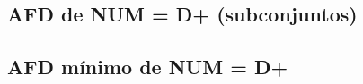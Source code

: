 \documentclass[11pt]{article}
\begin{document}
\subsection*{AFD de NUM = D+ (subconjuntos)}
\begin{center}\resizebox{\linewidth}{!}{}\end{center}

\subsection*{AFD mínimo de NUM = D+}
\begin{center}\resizebox{\linewidth}{!}{}\end{center}
\end{document}
